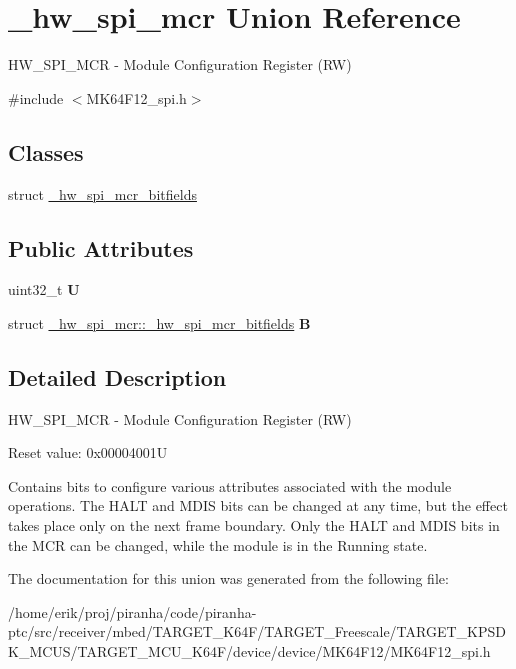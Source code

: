 \hypertarget{union__hw__spi__mcr}{}\section{\+\_\+hw\+\_\+spi\+\_\+mcr Union Reference}
\label{union__hw__spi__mcr}


H\+W\+\_\+\+S\+P\+I\+\_\+\+M\+CR -\/ Module Configuration Register (RW)  




{\ttfamily \#include $<$M\+K64\+F12\+\_\+spi.\+h$>$}

\subsection*{Classes}
\begin{DoxyCompactItemize}
\item 
struct \hyperlink{struct__hw__spi__mcr_1_1__hw__spi__mcr__bitfields}{\+\_\+hw\+\_\+spi\+\_\+mcr\+\_\+bitfields}
\end{DoxyCompactItemize}
\subsection*{Public Attributes}
\begin{DoxyCompactItemize}
\item 
uint32\+\_\+t {\bfseries U}\hypertarget{union__hw__spi__mcr_a6f4db8d0ba5e5dd21223ebcbac97ce22}{}\label{union__hw__spi__mcr_a6f4db8d0ba5e5dd21223ebcbac97ce22}

\item 
struct \hyperlink{struct__hw__spi__mcr_1_1__hw__spi__mcr__bitfields}{\+\_\+hw\+\_\+spi\+\_\+mcr\+::\+\_\+hw\+\_\+spi\+\_\+mcr\+\_\+bitfields} {\bfseries B}\hypertarget{union__hw__spi__mcr_ac2a508d2b46aef0e3d2268a1a28c2c9f}{}\label{union__hw__spi__mcr_ac2a508d2b46aef0e3d2268a1a28c2c9f}

\end{DoxyCompactItemize}


\subsection{Detailed Description}
H\+W\+\_\+\+S\+P\+I\+\_\+\+M\+CR -\/ Module Configuration Register (RW) 

Reset value\+: 0x00004001U

Contains bits to configure various attributes associated with the module operations. The H\+A\+LT and M\+D\+IS bits can be changed at any time, but the effect takes place only on the next frame boundary. Only the H\+A\+LT and M\+D\+IS bits in the M\+CR can be changed, while the module is in the Running state. 

The documentation for this union was generated from the following file\+:\begin{DoxyCompactItemize}
\item 
/home/erik/proj/piranha/code/piranha-\/ptc/src/receiver/mbed/\+T\+A\+R\+G\+E\+T\+\_\+\+K64\+F/\+T\+A\+R\+G\+E\+T\+\_\+\+Freescale/\+T\+A\+R\+G\+E\+T\+\_\+\+K\+P\+S\+D\+K\+\_\+\+M\+C\+U\+S/\+T\+A\+R\+G\+E\+T\+\_\+\+M\+C\+U\+\_\+\+K64\+F/device/device/\+M\+K64\+F12/M\+K64\+F12\+\_\+spi.\+h\end{DoxyCompactItemize}
